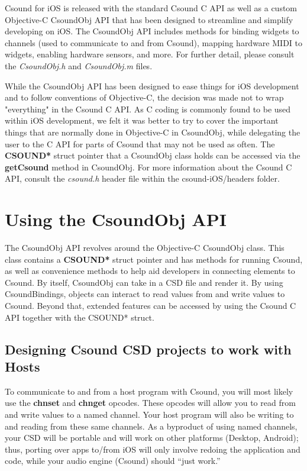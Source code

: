 \documentclass[11pt]{article}
\begin{document}
Csound for iOS is released with the standard Csound C API as well as a custom Objective-C CsoundObj API that has been designed to streamline and simplify developing on iOS.  The CsoundObj API includes methods for binding widgets to channels (used to communicate to and from Csound), mapping hardware MIDI to widgets, enabling hardware sensors, and more.  For further detail, please consult the \textit{CsoundObj.h} and \textit{CsoundObj.m} files.

While the CsoundObj API has been designed to ease things for iOS development and to follow conventions of Objective-C, the decision was made not to wrap "everything" in the Csound C API.  As C coding is commonly found to be used within iOS development, we felt it was better to try to cover the important things that are normally done in Objective-C in CsoundObj, while delegating the user to the C API for parts of Csound that may not be used as often.  The \textbf{CSOUND*} struct pointer that a CsoundObj class holds can be accessed via the \textbf{getCsound} method in CsoundObj.  For more information about the Csound C API, consult the \textit{csound.h} header file within the csound-iOS/headers folder.

\section{Using the CsoundObj API}

The CsoundObj API revolves around the Objective-C CsoundObj class. This class contains a \textbf{CSOUND*} struct pointer and has methods for running Csound, as well as convenience methods to help aid developers in connecting elements to Csound. By itself, CsoundObj can take in a CSD file and render it.  By using CsoundBindings, objects can interact to read values from and write values to Csound.  Beyond that, extended features can be accessed by using the Csound C API together with the CSOUND* struct.

\subsection{Designing Csound CSD projects to work with Hosts}

To communicate to and from a host program with Csound, you will most likely use the \textbf{chnset} and \textbf{chnget} opcodes. These opcodes will allow you to read from and write values to a named channel.  Your host program will also be writing to and reading from these same channels.  As a byproduct of using named channels, your CSD will be portable and will work on other platforms (Desktop, Android); thus, porting over apps to/from iOS will only involve redoing the application and code, while your audio engine (Csound) should ``just work.''
\end{document}
